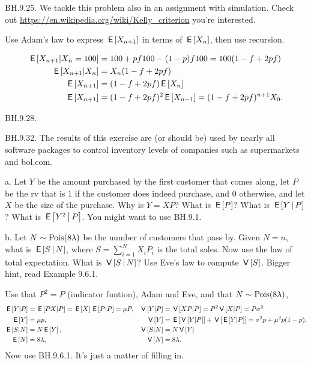 \begin{exercise}
BH.9.25. We tackle this problem also in an assignment with simulation.  Check out \url{https://en.wikipedia.org/wiki/Kelly_criterion} you're interested.
\begin{hint}
Use Adam's law to express $\,\mathsf{E}\left[X_{n+1}\right]$ in terms of $\,\mathsf{E}\left[X_{n}\right]$, then use recursion.
\end{hint}
\begin{solution}
\begin{align*}
  \,\mathsf{E}\left[X_{n+1} |X_n=100\right] &= 100 + pf 100 - (1-p)f 100  = 100(1-f + 2pf) \\
  \,\mathsf{E}\left[X_{n+1} |X_n\right] &= X_{n}( 1- f + 2pf) \\
  \,\mathsf{E}\left[X_{n+1} \right] &= ( 1- f + 2pf) \,\mathsf{E}\left[X_{n}\right] \\
  \,\mathsf{E}\left[X_{n+1} \right] &= ( 1- f + 2pf)^{2} \,\mathsf{E}\left[X_{n-1}\right] =  ( 1- f + 2pf)^{n+1}X_{0}.
\end{align*}
\end{solution}
\end{exercise}


\setcounter{theorem}{27}
\begin{exercise}
BH.9.28.
\end{exercise}




\setcounter{theorem}{31}
\begin{exercise}
BH.9.32. The results of this exercise are (or should be) used by nearly all software packages to control inventory levels of companies such as supermarkets and bol.com.
\begin{hint}
a. Let $Y$ be the amount purchased by the first customer that comes along, let $P$ be the rv that is 1 if the customer does indeed purchase, and 0 otherwise, and let $X$ be the size of the purchase. Why is $Y=XP$? What is $\,\mathsf{E}\left[P\right]$? What is $\,\mathsf{E}\left[Y\,\middle|\, P\right]$? What is $\,\mathsf{E}\left[Y^{2}\,\middle|\, P\right]$. You might want to use BH.9.1.


b. Let $N\sim\mathrm{Pois}(8\lambda)$ be the number of customers that pass by. Given $N=n$, what is $\,\mathsf{E}\left[S\,\middle|\, N\right]$, where $S=\sum_{i=1}^N X_iP_{i}$ is the total sales. Now use the law of total expectation. What is $\,\mathsf{V}\left[S\,\middle|\, N\right]$? Use Eve's law  to compute $\,\mathsf{V}\left[S\right]$. Bigger hint, read Example 9.6.1.
\end{hint}
\begin{solution}
Use that $P^{2}=P$ (indicator funtion), Adam and Eve, and that $N\sim \mathrm{Pois}(8\lambda)$,
\begin{align*}
  \,\mathsf{E}\left[Y|P\right]&= \,\mathsf{E}\left[PX|P\right] = \,\mathsf{E}\left[X\right]\,\mathsf{E}\left[P|P\right] = \mu P, &\,\mathsf{V}\left[Y|P\right] &= \,\mathsf{V}\left[XP|P\right] = P^{2} \,\mathsf{V}\left[X|P\right] = P \sigma^2 \\
  \,\mathsf{E}\left[Y\right] &= \mu p, & \,\mathsf{V}\left[Y\right] &= \,\mathsf{E}\left[\,\mathsf{V}\left[Y|P\right]\right] + \,\mathsf{V}\left[\,\mathsf{E}\left[Y|P\right]\right] = \sigma^2 p + \mu^{2}p(1-p), \\
  \,\mathsf{E}\left[S|N\right] &= N \,\mathsf{E}\left[Y\right], & \,\mathsf{V}\left[S|N\right] &= N \,\mathsf{V}\left[Y\right] \\
  \,\mathsf{E}\left[N\right] &= 8 \lambda, & \,\mathsf{V}\left[N\right] &=  8\lambda.
\end{align*}
Now use BH.9.6.1. It's just a matter of filling in.
\end{solution}
\end{exercise}


